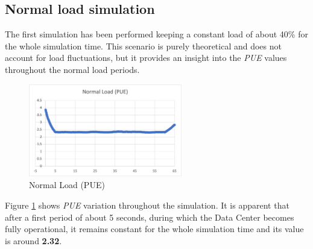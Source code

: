 \subsection{Normal load simulation} \label{subsection:normalload}
The first simulation has been performed keeping a constant load of about 40\% for the whole simulation time. This scenario is purely theoretical and does not account for load fluctuations, but it provides an insight into the \emph{PUE} values throughout the normal load periods. 
\begin{figure}[h]
    \centering
    \includegraphics[width=0.6\textwidth]{chapters/images/normal_load_pue.png}
    \caption{Normal Load (PUE)}
    \label{fig:normal_load_pue}
\end{figure}
Figure \ref{fig:normal_load_pue} shows \emph{PUE} variation throughout the simulation. It is apparent that after a first period of about 5 seconds, during which the Data Center becomes fully operational, it remains constant for the whole simulation time and its value is around \textbf{2.32}. 

